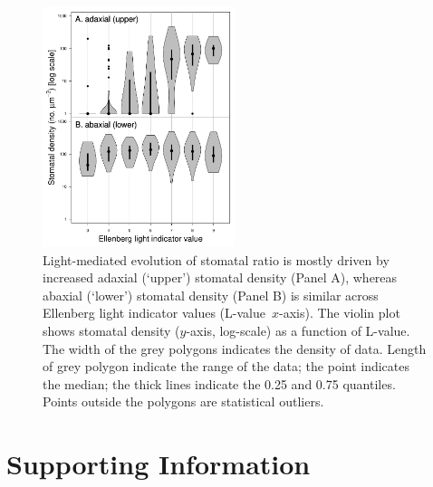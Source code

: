 \documentclass[12pt, oneside]{article}
\newcommand{\el}{L-value}
\begin{document}
\begin{figure}[ht]
\centerline{\includegraphics[width=0.5\textwidth]{Figures/Figure_SD-light.pdf}}
\caption{Light-mediated evolution of stomatal ratio is mostly driven by increased adaxial (`upper') stomatal density (Panel A), whereas abaxial (`lower') stomatal density (Panel B) is similar across Ellenberg light indicator values (\el~$x$-axis). The violin plot shows stomatal density ($y$-axis, log-scale) as a function of \el. The width of the grey polygons indicates the density of data. Length of grey polygon indicate the range of the data; the point indicates the median; the thick lines indicate the 0.25 and 0.75 quantiles. Points outside the polygons are statistical outliers.} 
\label{fig:SD-light}
\end{figure}

\clearpage


\section*{Supporting Information}

\renewcommand\thefigure{S\arabic{figure}}    
\renewcommand\thetable{S\arabic{table}}    
\renewcommand\theequation{S\arabic{equation}}    
\setcounter{table}{0}    
\setcounter{equation}{0}
\setcounter{figure}{0}

\end{document}
